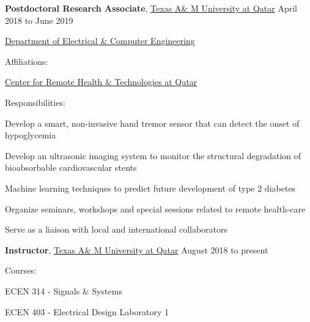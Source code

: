 \documentclass[10pt]{article}
\newcommand{\halfblankline}{\quad\vspace{-0.5\baselineskip}\pagebreak[3]}
\begin{document}
\textbf{Postdoctoral Research Associate},
            \href{http://www.qatar.tamu.edu/}{Texas A\& M University at Qatar}
            \hfill {April 2018 to June 2019}
\begin{innerlist}

    \item[] \href{https://www.qatar.tamu.edu/programs/ecen/}{Department of Electrical \& Computer Engineering}
    \begin{innerlist}
        \item Affiliations:
            \begin{innerlist}
                \item[] \href{https://www.qatar.tamu.edu/programs/ecen/research/center-for-remote-healthcare-technology-extension}{Center for Remote Health \& Technologies at Qatar}
            \end{innerlist}
                \item Responsibilities:
            \begin{innerlist} [itemsep=1mm]
                \item[] Develop a smart, non-invasive hand tremor sensor that can detect the onset of hypoglycemia
                \item[] Develop an ultrasonic imaging system to monitor the structural degradation of bioabsorbable cardiovascular stents
                \item[] Machine learning techniques to predict future development of type 2 diabetes
                \item[] Organize seminars, workshops and special sessions related to remote health-care
                \item[] Serve as a liaison with local and international collaborators
            \end{innerlist}
    \end{innerlist}
\end{innerlist}

\halfblankline

\textbf{Instructor},
            \href{http://www.tamu.edu/}{Texas A\& M University at Qatar}
            \hfill {August 2018 to present}
\begin{innerlist}
        \item Courses:
            \begin{innerlist}
                \item[] {ECEN 314 - Signals \& Systems}
                \item[] {ECEN 403 - Electrical Design Laboratory 1}
            \end{innerlist}
\end{innerlist}
\halfblankline
\end{document}
